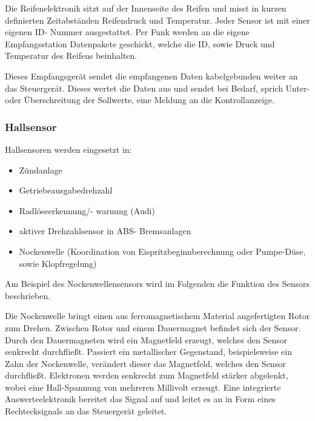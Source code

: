                 
                Die Reifenelektronik sitzt auf der Innenseite des Reifen und misst in kurzen definierten Zeitabständen Reifendruck und Temperatur. 
                Jeder Sensor ist mit einer eigenen ID- Nummer ausgestattet. Per Funk werden an die eigene Empfangsstation Datenpakete geschickt, welche die ID, sowie Druck und Temperatur des Reifens beinhalten.

                Dieses Empfangsgerät sendet die empfangenen Daten kabelgebunden weiter an das Steuergerät. Dieses wertet die Daten aus und sendet bei Bedarf, sprich Unter- oder Überschreitung der Sollwerte, eine Meldung an die Kontrollanzeige.
				
                \subsubsection{Hallsensor}

				Hallsensoren werden eingesetzt in: 
				\begin{itemize}
					\item Zündanlage
					\item Getriebeausgabedrehzahl
					\item Radlöseerkennung/- warnung (Audi)
					\item aktiver Drehzahlsensor in ABS- Bremsanlagen
					\item Nockenwelle (Koordination von Eispritzbeginnberechnung oder Pumpe-Düse, sowie Klopfregelung)
				\end{itemize}
				
                Am Beispiel des Nockenwellensensors wird im Folgenden die Funktion des Sensors beschrieben.
                
                Die Nockenwelle bringt einen aus ferromagnetischem Material angefertigten Rotor zum Drehen. Zwischen Rotor und einem Dauermagnet befindet sich der Sensor.
                Durch den Dauermagneten wird ein Magnetfeld erzeugt, welches den Sensor senkrecht durchfließt. Passiert ein metallischer Gegenstand, beispielsweise ein Zahn der Nockenwelle, verändert dieser das Magnetfeld, welches den Sensor durchfließt.
				Elektronen werden senkrecht zum Magnetfeld stärker abgelenkt, wobei eine Hall-Spannung von mehreren Millivolt erzeugt. Eine integrierte Auswerteelektronik bereitet das Signal auf und leitet es an in Form eines Rechtecksignals an das Steuergerät geleitet. \cite{TS_hall}

